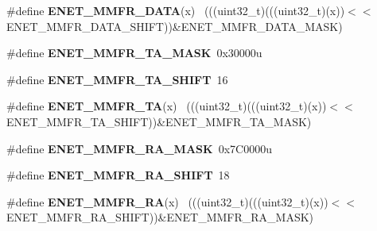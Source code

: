 \begin{DoxyCompactItemize}
\item 
\hypertarget{group___e_n_e_t___register___masks_ga10445c7b9ca61adc49fc110addf10270}{}\#define {\bfseries E\+N\+E\+T\+\_\+\+M\+M\+F\+R\+\_\+\+D\+A\+T\+A}(x)                                            ~(((uint32\+\_\+t)(((uint32\+\_\+t)(x))$<$$<$E\+N\+E\+T\+\_\+\+M\+M\+F\+R\+\_\+\+D\+A\+T\+A\+\_\+\+S\+H\+I\+F\+T))\&E\+N\+E\+T\+\_\+\+M\+M\+F\+R\+\_\+\+D\+A\+T\+A\+\_\+\+M\+A\+S\+K)\label{group___e_n_e_t___register___masks_ga10445c7b9ca61adc49fc110addf10270}

\item 
\hypertarget{group___e_n_e_t___register___masks_gac8464f2aec3816fb4088c18ff6a85f54}{}\#define {\bfseries E\+N\+E\+T\+\_\+\+M\+M\+F\+R\+\_\+\+T\+A\+\_\+\+M\+A\+S\+K}~0x30000u\label{group___e_n_e_t___register___masks_gac8464f2aec3816fb4088c18ff6a85f54}

\item 
\hypertarget{group___e_n_e_t___register___masks_ga9559ded561df2769ecd05aed1233943a}{}\#define {\bfseries E\+N\+E\+T\+\_\+\+M\+M\+F\+R\+\_\+\+T\+A\+\_\+\+S\+H\+I\+F\+T}~16\label{group___e_n_e_t___register___masks_ga9559ded561df2769ecd05aed1233943a}

\item 
\hypertarget{group___e_n_e_t___register___masks_ga2f204221f9cb62850cce6f7bb9bbd8d1}{}\#define {\bfseries E\+N\+E\+T\+\_\+\+M\+M\+F\+R\+\_\+\+T\+A}(x)                                                ~(((uint32\+\_\+t)(((uint32\+\_\+t)(x))$<$$<$E\+N\+E\+T\+\_\+\+M\+M\+F\+R\+\_\+\+T\+A\+\_\+\+S\+H\+I\+F\+T))\&E\+N\+E\+T\+\_\+\+M\+M\+F\+R\+\_\+\+T\+A\+\_\+\+M\+A\+S\+K)\label{group___e_n_e_t___register___masks_ga2f204221f9cb62850cce6f7bb9bbd8d1}

\item 
\hypertarget{group___e_n_e_t___register___masks_ga3325bdb05d05a8ec384202a6537a7f9f}{}\#define {\bfseries E\+N\+E\+T\+\_\+\+M\+M\+F\+R\+\_\+\+R\+A\+\_\+\+M\+A\+S\+K}~0x7\+C0000u\label{group___e_n_e_t___register___masks_ga3325bdb05d05a8ec384202a6537a7f9f}

\item 
\hypertarget{group___e_n_e_t___register___masks_gacb92c97e6dc7b0e466141a7f7cb63f4d}{}\#define {\bfseries E\+N\+E\+T\+\_\+\+M\+M\+F\+R\+\_\+\+R\+A\+\_\+\+S\+H\+I\+F\+T}~18\label{group___e_n_e_t___register___masks_gacb92c97e6dc7b0e466141a7f7cb63f4d}

\item 
\hypertarget{group___e_n_e_t___register___masks_gac63e64bff01730ed9b3d9a8af6bc1d91}{}\#define {\bfseries E\+N\+E\+T\+\_\+\+M\+M\+F\+R\+\_\+\+R\+A}(x)                                                ~(((uint32\+\_\+t)(((uint32\+\_\+t)(x))$<$$<$E\+N\+E\+T\+\_\+\+M\+M\+F\+R\+\_\+\+R\+A\+\_\+\+S\+H\+I\+F\+T))\&E\+N\+E\+T\+\_\+\+M\+M\+F\+R\+\_\+\+R\+A\+\_\+\+M\+A\+S\+K)\label{group___e_n_e_t___register___masks_gac63e64bff01730ed9b3d9a8af6bc1d91}


\end{DoxyCompactItemize}
